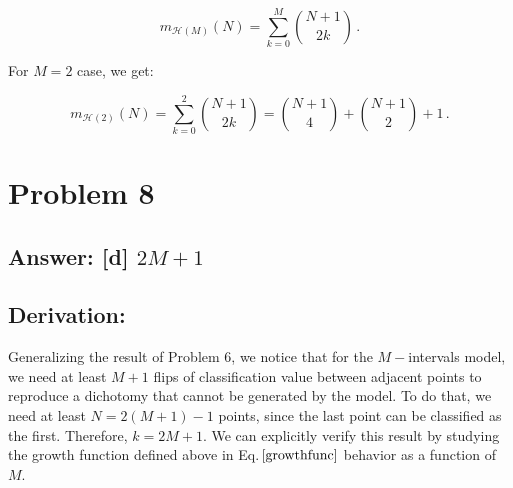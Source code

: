 \documentclass[11pt]{article}
\begin{document}
\[
\label{growthfunc}
m_{\mathcal{H}(M)}(N)=\sum^M_{k=0} {N+1\choose2 k}\,.
\]

For \(M=2\) case, we get:

\[
m_{\mathcal{H}(2)}(N)=\sum^2_{k=0} {N+1\choose2 k}={N+1\choose4}+{N+1\choose2}+1\,.
\]

    \hypertarget{problem-8}{%
\section{Problem 8}\label{problem-8}}

\hypertarget{answer-d-2m1}{%
\subsection{\texorpdfstring{Answer: {[}d{]}
\(2M+1\)}{Answer: {[}d{]} 2M+1}}\label{answer-d-2m1}}

\hypertarget{derivation}{%
\subsection{Derivation:}\label{derivation}}

Generalizing the result of Problem 6, we notice that for the
\(M-\)intervals model, we need at least \(M+1\) flips of classification
value between adjacent points to reproduce a dichotomy that cannot be
generated by the model. To do that, we need at least \(N=2(M+1)-1\)
points, since the last point can be classified as the first. Therefore,
\(k=2M+1\). We can explicitly verify this result by studying the growth
function defined above in Eq.\(\,\eqref{growthfunc}\) behavior as a
function of \(M\).
\end{document}
